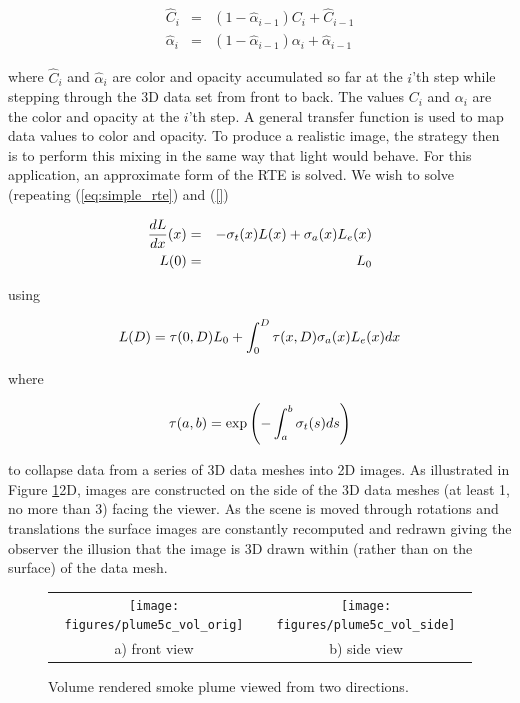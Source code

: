 \begin{eqnarray*}
\hat{C}_i&=&\left(1-\hat{\alpha}_{i-1}\right)C_i + \hat{C}_{i-1}\\
\hat{\alpha}_i&=&\left(1-\hat{\alpha}_{i-1}\right)\alpha_i+\hat{\alpha}_{i-1}
\end{eqnarray*}

where $\hat{C}_i$ and $\hat{\alpha}_i$ are color and opacity accumulated so far at the $i$'th step while stepping through the 3D data set from front to back.  The values $C_i$ and $\alpha_i$
are the color and opacity at the $i$'th step.  A general transfer function is used to map data values to color and opacity. To produce a realistic image, the strategy then is to perform this mixing in the same way that light would behave.  For this application, an approximate form of the RTE is solved.  We wish to solve (repeating (\ref{eq:simple_rte}) and (\ref{})

\begin{eqnarray}
\label{eq:simple_rtee}
\frac{dL}{dx}(x)&=&-\sigma_t(x) L(x) + \sigma_a(x) L_e(x)\\
 L(0)&=&L_0\nonumber
\end{eqnarray}

using

\begin{equation}
\label{eq:rtesoln}
 L(D)=\tau(0,D)L_0 + \int_0^D\tau(x,D)\sigma_a(x)L_e(x) dx
\end{equation}

where

\begin{equation}
\label{eq:optdepth}
\tau(a,b)=\exp\left({-\int_a^b \sigma_t(s) ds}\right)
\end{equation}

to collapse data from a series of 3D data meshes into 2D images. As illustrated in Figure \ref{fig:volplume_example}2D, images are constructed on the side of the 3D data meshes (at
least 1, no more than 3) facing the viewer.  As the scene is moved through rotations and translations the surface images are constantly recomputed and redrawn giving the observer the illusion that the image is 3D drawn within (rather than on the surface) of the data mesh.

\begin{figure}[\figoptions]
\begin{center}
\begin{tabular}{cc}
\texttt{[image: figures/plume5c\_vol\_orig]}&
\texttt{[image: figures/plume5c\_vol\_side]}\\
a) front view&b) side view\\
\end{tabular}
\end{center}
\caption {Volume rendered smoke plume viewed from two directions.}
\label{fig:volplume_example}
\end{figure}

